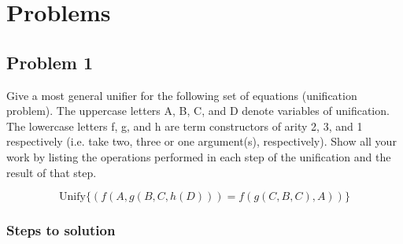 
\usepackage{algorithm}
\usepackage{listings}
\usepackage{graphicx,amssymb,amsmath}
\usepackage{epstopdf}
\sloppy

\oddsidemargin 0in
\evensidemargin 0in
\textwidth 6.5in
\topmargin -0.5in
\textheight 9.0in




\pagestyle{myheadings}  %
	 	
\section{Problems}

\subsection{Problem 1}
Give a most general unifier for the following set of equations (unification problem). The uppercase letters A, B, C, and D denote variables of unification. The lowercase letters f, g, and h are term constructors of arity 2, 3, and 1 respectively (i.e. take two, three or one argument(s), respectively). Show all your work by listing the operations performed in each step of the unification and the result of that step.

\[
	\text{Unify}\{(f(A, g(B, C, h(D))) = f(g(C, B, C), A))\}
\]

\subsubsection{Steps to solution}

